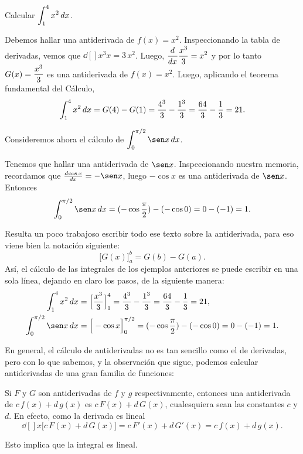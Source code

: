 \begin{example}
  Calcular $\displaystyle \int_1^4 x^2 \,dx$.

  Debemos hallar una antiderivada de $f(x)=x^2$. Inspeccionando la tabla de derivadas, vemos que $\dd[]{x^3}{x} = 3 \,x^2$. Luego, $\displaystyle\frac{d^{} {}}{d x^{}}\frac{x^3}3 = x^2$ y por lo tanto $G(x)=\displaystyle\frac{x^3}3 $ es una antiderivada de $f(x)=x^2$. Luego, aplicando el teorema fundamental del Cálculo,
  \[
    \int_1^4 x^2 \,dx = G(4) - G(1) = \frac{4^3}3-\frac{1^3}3 = \frac{64}3-\frac13=21.
  \]
\end{example}

\begin{example}
  Consideremos ahora el cálculo de $\D\int_0^{\pi/2} \sen x \dx$.

  Tenemos que hallar una antiderivada de $\sen x$.
  Inspeccionando nuestra memoria, recordamos que $\dd{\cos x}{x}=-\sen x$, luego $-\cos x$ es una antiderivada de $\sen x$. Entonces
  \[
  \int_0^{\pi/2} \sen x\dx = (-\cos \frac\pi2)-(-\cos 0)=0-(-1)=1.
  \]
\end{example}

Resulta un poco trabajoso escribir todo ese texto sobre la antiderivada, para eso viene bien la notación siguiente:
\[
\big[G(x)\big]_a^b = G(b)-G(a).
\]
Así, el cálculo de las integrales de los ejemplos anteriores se puede escribir en una sola línea, dejando en claro los pasos, de la siguiente manera:
\begin{align*}
  \int_1^4 x^2 \dx &= \Big[ \frac{x^3}{3}\Big]_1^4 =\frac{4^3}3-\frac{1^3}3 = \frac{64}3-\frac13=21,
  \\
  \int_0^{\pi/2} \sen x\dx &= \Big[ -\cos x \Big]_{0}^{\pi/2} = (-\cos \frac\pi2)-(-\cos 0)=0-(-1)=1.
\end{align*}

En general, el cálculo de antiderivadas no es tan sencillo como el de derivadas, pero con lo que sabemos, y la observación que sigue, podemos calcular antiderivadas de una gran familia de funciones:

\begin{remark}
  Si $F$ y $G$ son antiderivadas de $f$ y $g$ respectivamente, entonces una antiderivada de $c\, f(x)+d\, g(x)$ es 
  $c\, F(x) + d\, G(x)$, cualesquiera sean las constantes $c$ y $d$.
  En efecto, como la derivada es lineal
  $$ 
  \dd[]{}{x}\big[c\, F(x) + d\, G(x) \big] = c\, F'(x)+d\,G'(x) = c\, f(x)+d\, g(x).
  $$
\end{remark}

Esto implica que la integral es lineal.

